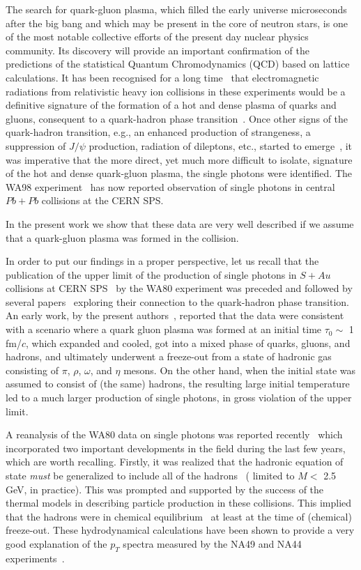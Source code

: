 The search for quark-gluon plasma, which filled the early
universe microseconds after the big bang and which may be present in the
 core of neutron stars, is one of the most notable collective efforts
 of the present day nuclear physics community. 
Its discovery will provide an important confirmation of the
predictions of the statistical Quantum Chromodynamics (QCD) based on
 lattice calculations. It has been
recognised for a long time~\cite{early}  that electromagnetic radiations from 
relativistic heavy ion collisions in these experiments would be 
a definitive signature of the
formation of a hot and dense plasma of quarks and gluons, consequent to a
quark-hadron phase transition~\cite{early}.
Once other signs of the quark-hadron transition, e.g., 
an enhanced production of strangeness, a suppression of $J/\psi$
production,  radiation of dileptons,
etc., started to emerge~\cite{qm99}, it was imperative that
the more direct, yet much more difficult to isolate, signature
of the hot and dense quark-gluon plasma, the single photons
were identified. The WA98 experiment~\cite{wa98} has now reported
observation of single photons in central $Pb+Pb$ collisions at the
CERN SPS.

In the present work we show that these data are
very well described if we assume that a quark-gluon plasma was
formed in the collision.

In order to put our findings in a proper perspective, 
let us  recall that the publication of the upper limit of the production of
single photons in $S+Au$ collisions at CERN SPS~\cite{wa80}
by the WA80 experiment was preceded and followed by 
several papers~\cite{prl,others}
exploring their connection to the quark-hadron phase
transition. An early work, by the present authors~\cite{prl}, reported
that the data were consistent with a scenario where a quark gluon
plasma was formed at  an initial time $\tau_0\sim$ 1 fm/$c$, which expanded
and cooled, got into a mixed phase of quarks, gluons, and hadrons,
and ultimately underwent a freeze-out  from a  state of hadronic gas
consisting of $\pi$, $\rho$, $\omega$, and $\eta$ mesons. 
On the other hand, when the initial state was assumed to consist
of (the same) hadrons, the resulting large initial temperature led to a
much larger production of single photons, in  gross violation of the
upper limit.

A reanalysis of the WA80 data on single photons was reported 
recently~\cite{zpc1} which incorporated two important developments in 
the field during the last few years, which are worth recalling.
 Firstly, it was realized 
that the hadronic equation of state {\em must} be generalized to
include all of the hadrons~\cite{crs} 
 ( limited to $M <$ 2.5 GeV, in practice). This was prompted and
supported by the success of the
thermal models in describing particle production in these 
collisions. This implied that the hadrons were in
chemical equilibrium~\cite{johanna} at least at the time of
 (chemical) freeze-out. These hydrodynamical calculations have been 
shown to provide a very good explanation of the $p_T$ spectra 
measured by the NA49 and NA44 experiments~\cite{had_dil}. 

